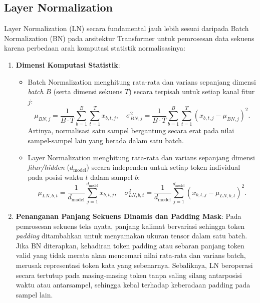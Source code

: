 \documentclass[12pt,a4paper]{article}
\begin{document}
\subsection{Layer Normalization}
Layer Normalization (LN) secara fundamental jauh lebih sesuai daripada Batch Normalization (BN) pada arsitektur Transformer untuk pemrosesan data sekuens karena perbedaan arah komputasi statistik normalisasinya:
\begin{enumerate}
    \item \textbf{Dimensi Komputasi Statistik}:
    \begin{itemize}
        \item Batch Normalization menghitung rata-rata dan varians sepanjang dimensi \emph{batch} $B$ (serta dimensi sekuens $T$) secara terpisah untuk setiap kanal fitur $j$:
        \begin{equation}
            \mu_{BN, j} = \frac{1}{B \cdot T} \sum_{b=1}^B \sum_{t=1}^T x_{b, t, j}, \quad
            \sigma^2_{BN, j} = \frac{1}{B \cdot T} \sum_{b=1}^B \sum_{t=1}^T (x_{b, t, j} - \mu_{BN, j})^2.
        \end{equation}
        Artinya, normalisasi satu sampel bergantung secara erat pada nilai sampel-sampel lain yang berada dalam satu batch.
        \item Layer Normalization menghitung rata-rata dan varians sepanjang dimensi \emph{fitur/hidden} ($d_{\text{model}}$) secara independen untuk setiap token individual pada posisi waktu $t$ dalam sampel $b$:
        \begin{equation}
            \mu_{LN, b, t} = \frac{1}{d_{\text{model}}} \sum_{j=1}^{d_{\text{model}}} x_{b, t, j}, \quad
            \sigma^2_{LN, b, t} = \frac{1}{d_{\text{model}}} \sum_{j=1}^{d_{\text{model}}} (x_{b, t, j} - \mu_{LN, b, t})^2.
        \end{equation}
    \end{itemize}

    \item \textbf{Penanganan Panjang Sekuens Dinamis dan Padding Mask}: Pada pemrosesan sekuens teks nyata, panjang kalimat bervariasi sehingga token \emph{padding} ditambahkan untuk menyamakan ukuran tensor dalam satu batch. Jika BN diterapkan, kehadiran token padding atau sebaran panjang token valid yang tidak merata akan mencemari nilai rata-rata dan varians batch, merusak representasi token kata yang sebenarnya. Sebaliknya, LN beroperasi secara tertutup pada masing-masing token tanpa saling silang antarposisi waktu atau antarsampel, sehingga kebal terhadap keberadaan padding pada sampel lain.


\end{enumerate}
\end{document}

